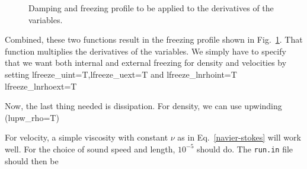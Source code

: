 \documentclass[a4paper,10pt]{article}
\begin{document}
\begin{figure}
\label{border}
\begin{center}
\end{center}
\caption[]{Damping and freezing profile to be applied to the derivatives of the variables.}
\end{figure}

Combined, these two functions result in the freezing profile shown in Fig.~\ref{border}. That function multiplies the derivatives of the variables. We simply have to specify that we  want both internal and external freezing for density and velocities by setting 
lfreeze\_uint=T,lfreeze\_uext=T and lfreeze\_lnrhoint=T lfreeze\_lnrhoext=T

Now, the last thing needed is dissipation. For density, we can use upwinding (lupw\_rho=T)

For velocity, a simple viscosity with constant $\nu$ as in Eq.~\ref{navier-stokes} will work well. For the choice of sound speed and length, $10^{-5}$ should do. The {\tt run.in} file should then be
\end{document}
